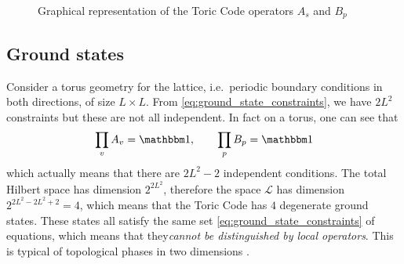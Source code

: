 \begin{figure}[t]
    \centering
    
    \caption{Graphical representation of the Toric Code operators $A_s$ and $B_p$}
\end{figure}

\subsection{Ground states}
\label{sub:ground_states}


Consider a torus geometry for the lattice, i.e.~periodic boundary conditions in both directions, of size $L \times L$.
From \eqref{eq:ground_state_constraints}, we have $2L^2$ constraints but these are not all independent.
In fact on a torus, one can see that
\begin{equation}
    \prod_{v} A_{v} = \identity, \qquad
    \prod_{p} B_p = \identity
\end{equation}
which actually means that there are $2L^2 - 2$ independent conditions.
The total Hilbert space has dimension $2^{2L^2}$, therefore the space $\mathcal{L}$ has dimension $2^{2L^2 - 2L^2 + 2} = 4$, which means that the Toric Code has $4$ degenerate ground states.
These states all satisfy the same set \eqref{eq:ground_state_constraints} of equations, which means that they\emph{cannot be distinguished by local operators}.
This is typical of topological phases in two dimensions .

